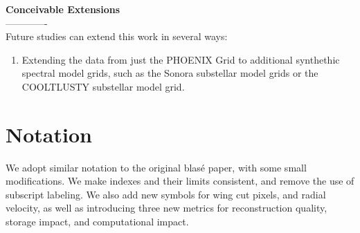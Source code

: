 \documentclass[twocolumn]{aastex631}
\begin{document}
\begin{mdframed}
    \textbf{Conceivable Extensions}
    \\-------------\\
    Future studies can extend this work in several ways:
    \begin{enumerate}[label=-]
        \item Extending the data from just the PHOENIX Grid to additional synthethic spectral
              model grids, such as the Sonora substellar model grids or the COOLTLUSTY substellar model grid.
    \end{enumerate}
\end{mdframed}



\pagebreak
\newpage

\begin{acknowledgments}
    \blindtext
\end{acknowledgments}


\software{}


\clearpage

\appendix
\section{Notation}
We adopt similar notation to the original blas\'e paper, with some small modifications. We make indexes and
their limits consistent, and remove the use of subscript labeling. We also add new symbols for
wing cut pixels, and radial velocity, as well as introducing three new metrics for reconstruction quality,
storage impact, and computational impact.
\end{document}
